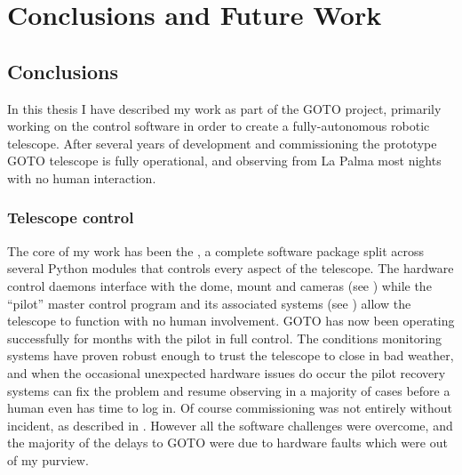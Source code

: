 \chapter{Conclusions and Future Work}
\label{chap:conclusion}
\chaptoc{}


\newpage
\section{Conclusions}
\label{sec:conclusion}
\begin{colsection}


\begin{colsection}

In this thesis I have described my work as part of the GOTO project, primarily working on the control software in order to create a fully-autonomous robotic telescope. After several years of development and commissioning the prototype GOTO telescope is fully operational, and observing from La Palma most nights with no human interaction.

\end{colsection}


\subsection{Telescope control}
\label{sec:control_results}
\begin{colsection}

The core of my work has been the , a complete software package split across several Python modules that controls every aspect of the telescope. The hardware control daemons interface with the dome, mount and cameras (see ) while the ``pilot'' master control program and its associated systems (see ) allow the telescope to function with no human involvement. GOTO has now been operating successfully for months with the pilot in full control. The conditions monitoring systems have proven robust enough to trust the telescope to close in bad weather, and when the occasional unexpected hardware issues do occur the pilot recovery systems can fix the problem and resume observing in a majority of cases before a human even has time to log in. Of course commissioning was not entirely without incident, as described in . However all the software challenges were overcome, and the majority of the delays to GOTO were due to hardware faults which were out of my purview.


\end{colsection}
\end{colsection}
